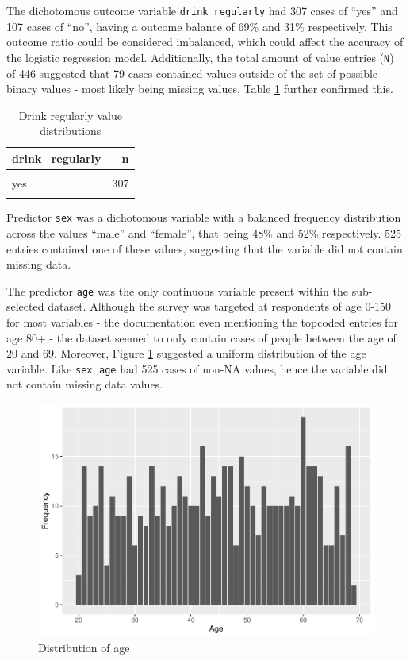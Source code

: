 \documentclass[
]{article}
\begin{document}
The dichotomous outcome variable \texttt{drink\_regularly} had 307 cases of ``yes'' and 107 cases of ``no'', having a outcome balance of 69\% and 31\% respectively. This outcome ratio could be considered imbalanced, which could affect the accuracy of the logistic regression model. Additionally, the total amount of value entries (\texttt{N}) of 446 suggested that 79 cases contained values outside of the set of possible binary values - most likely being missing values. Table \ref{tab:drink-missing} further confirmed this.

\begin{table}[!h]

\caption{\label{tab:drink-missing}Drink regularly value distributions}
\centering
\begin{tabular}[t]{lr}
\toprule
drink\_regularly & n\\
\midrule
\cellcolor{gray!6}{no} & \cellcolor{gray!6}{139}\\
yes & 307\\
\cellcolor{gray!6}{NA} & \cellcolor{gray!6}{79}\\
\bottomrule
\end{tabular}
\end{table}

Predictor \texttt{sex} was a dichotomous variable with a balanced frequency distribution across the values ``male'' and ``female'', that being 48\% and 52\% respectively. 525 entries contained one of these values, suggesting that the variable did not contain missing data.

The predictor \texttt{age} was the only continuous variable present within the sub-selected dataset. Although the survey was targeted at respondents of age 0-150 for most variables - the documentation even mentioning the topcoded entries for age 80+ - the dataset seemed to only contain cases of people between the age of 20 and 69. Moreover, Figure \ref{fig:age-dist} suggested a uniform distribution of the age variable.
Like \texttt{sex}, \texttt{age} had 525 cases of non-NA values, hence the variable did not contain missing data values.

\begin{figure}
\centering
\includegraphics{report_files/figure-latex/age-dist-1.pdf}
\caption{\label{fig:age-dist}Distribution of age}
\end{figure}
\end{document}
